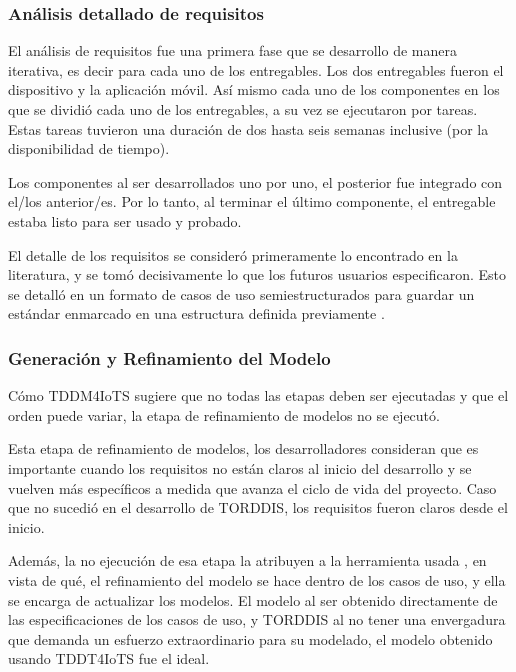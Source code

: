 \documentclass[a4paper,fleqn]{cas-sc}
\begin{document}
			\subsubsection{Análisis detallado de requisitos}
				El análisis de requisitos fue una primera fase que se desarrollo de manera iterativa, es decir para cada uno de los entregables. Los dos entregables fueron el dispositivo y la aplicación móvil. Así mismo cada uno de los componentes en los que se dividió cada uno de los entregables, a su vez se ejecutaron por tareas. Estas tareas tuvieron una duración de dos hasta seis semanas inclusive (por la disponibilidad de tiempo).
			
				Los componentes al ser desarrollados uno por uno, el posterior fue integrado con el/los anterior/es. Por lo tanto, al terminar el último componente, el entregable estaba listo para ser usado y probado.
			
				El detalle de los requisitos se consideró primeramente lo encontrado en la literatura, y se tomó decisivamente lo que los futuros usuarios especificaron. Esto se detalló en un formato de casos de uso semiestructurados para guardar un estándar enmarcado en una estructura definida previamente \citep{Zegzhda2018Use}.
			
			\subsubsection{Generación y Refinamiento del Modelo}
				Cómo TDDM4IoTS \citep{Guerrero-Ulloa2020TDDM4IoTS} sugiere que no todas las etapas deben ser ejecutadas y que el orden puede variar, la etapa de refinamiento de modelos no se ejecutó.
			
				Esta etapa de refinamiento de modelos, los desarrolladores consideran que es importante cuando los requisitos no están claros al inicio del desarrollo y se vuelven más específicos a medida que avanza el ciclo de vida del proyecto. Caso que no sucedió en el desarrollo de TORDDIS, los requisitos fueron claros desde el inicio.
			
				Además, la no ejecución de esa etapa la atribuyen a la herramienta usada \citep{Guerrero2024Test}, en vista de qué, el refinamiento del modelo se hace dentro de los casos de uso, y ella se encarga de actualizar los modelos. El modelo al ser obtenido directamente de las especificaciones de los casos de uso, y TORDDIS al no tener una envergadura que demanda un esfuerzo extraordinario para su modelado, el modelo obtenido usando TDDT4IoTS fue el ideal.
			
\end{document}
